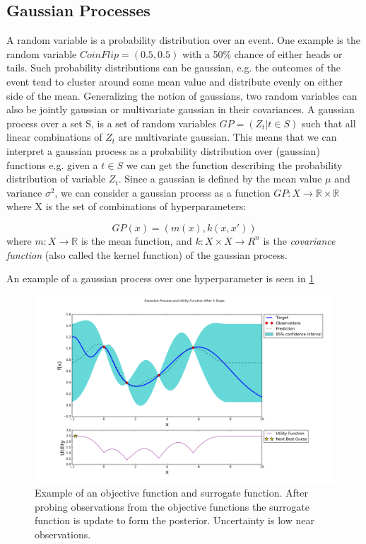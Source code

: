 \subsection{Gaussian Processes}
A random variable is a probability distribution over an event. One example is the random variable $CoinFlip = (0.5, 0.5)$ with a 50\% chance of either heads or tails. Such probability distributions can be gaussian, e.g. the outcomes of the event tend to cluster around some mean value and distribute evenly on either side of the mean. Generalizing the notion of gaussians, two random variables can also be jointly gaussian or multivariate gaussian in their covariances. A gaussian process over a set S, is a set of random variables $GP = (Z_t | t \in S)$ such that all linear combinations of $Z_t$ are multivariate gaussian. This means that we can interpret a gaussian process as a probability distribution over (gaussian) functions e.g. given a $t \in S$ we can get the function describing the probability distribution of variable $Z_t$. Since a gaussian is defined by the mean value $\mu$ and variance $\sigma^2$, we can consider a gaussian process as a function $GP : X \rightarrow \mathbb{R} \times \mathbb{R}$ where X is the set of combinations of hyperparameters:

\begin{equation}\label{gaussian-process}
GP(x) = (m(x), k(x, x'))
\end{equation}
where $m : X \rightarrow \mathbb{R}$ is the mean function, and $k : X \times X \rightarrow R^n$ is the \emph{covariance function} (also called the kernel function) of the gaussian process.

An example of a gaussian process over one hyperparameter is seen in \cref{fig:bayesian-optimization}
\begin{figure}%
	\centering
	\includegraphics[width=1\textwidth]{figures/BO.png}
	\vspace{-2em}
	\caption{Example of an objective function and surrogate function. After probing observations from the objective functions the surrogate function is update to form the posterior. Uncertainty is low near observations.}
	\label{fig:bayesian-optimization}
\end{figure}
